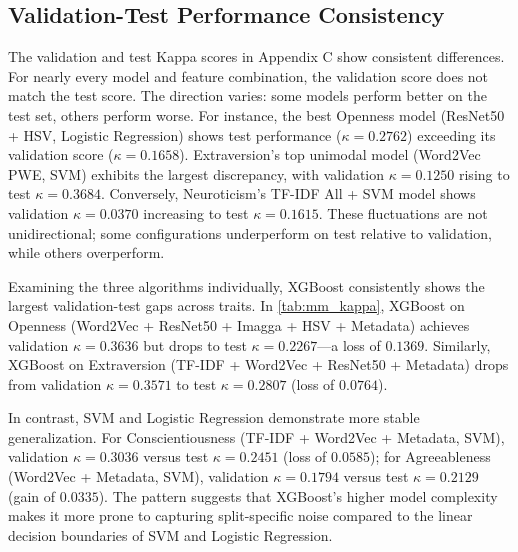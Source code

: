 \subsection{Validation-Test Performance Consistency}
The validation and test Kappa scores in Appendix C show consistent differences. For nearly every model and feature combination, the validation score does not match the test score. The direction varies: some models perform better on the test set, others perform worse. For instance, the best Openness model (ResNet50 + HSV, Logistic Regression) shows test performance ($\kappa=0.2762$) exceeding its validation score ($\kappa=0.1658$). Extraversion's top unimodal model (Word2Vec PWE, SVM) exhibits the largest discrepancy, with validation $\kappa=0.1250$ rising to test $\kappa=0.3684$. Conversely, Neuroticism's TF-IDF All + SVM model shows validation $\kappa=0.0370$ increasing to test $\kappa=0.1615$. These fluctuations are not unidirectional; some configurations underperform on test relative to validation, while others overperform.

Examining the three algorithms individually, XGBoost consistently shows the largest validation-test gaps across traits. In \ref{tab:mm_kappa}, XGBoost on Openness (Word2Vec + ResNet50 + Imagga + HSV + Metadata) achieves validation $\kappa=0.3636$ but drops to test $\kappa=0.2267$---a loss of $0.1369$. Similarly, XGBoost on Extraversion (TF-IDF + Word2Vec + ResNet50 + Metadata) drops from validation $\kappa=0.3571$ to test $\kappa=0.2807$ (loss of $0.0764$). 

In contrast, SVM and Logistic Regression demonstrate more stable generalization. For Conscientiousness (TF-IDF + Word2Vec + Metadata, SVM), validation $\kappa=0.3036$ versus test $\kappa=0.2451$ (loss of $0.0585$); for Agreeableness (Word2Vec + Metadata, SVM), validation $\kappa=0.1794$ versus test $\kappa=0.2129$ (gain of $0.0335$). The pattern suggests that XGBoost's higher model complexity %
makes it more prone to capturing split-specific noise compared to the linear decision boundaries of SVM and Logistic Regression. 

\begin{table}[h]
	\centering
	\caption{Validation-Test Kappa Gaps in Unimodal Combinations}
\end{table}

